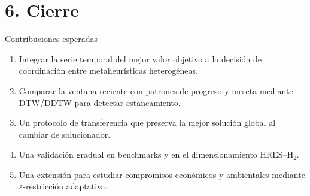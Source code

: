 \documentclass[aspectratio=169,11pt]{beamer}
\begin{document}
\section{6. Cierre}

\begin{frame}{Contribuciones esperadas}
  \begin{enumerate}
    \item Integrar la serie temporal del mejor valor objetivo a la decisión de coordinación entre metaheurísticas heterogéneas.
    \item Comparar la ventana reciente con patrones de progreso y meseta mediante DTW/DDTW para detectar estancamiento.
    \item Un protocolo de transferencia que preserva la mejor solución global al cambiar de solucionador.
    \item Una validación gradual en benchmarks y en el dimensionamiento HRES--H$_2$.
    \item Una extensión para estudiar compromisos económicos y ambientales mediante $\varepsilon$-restricción adaptativa.
  \end{enumerate}
\end{frame}

\appendix
\end{document}
